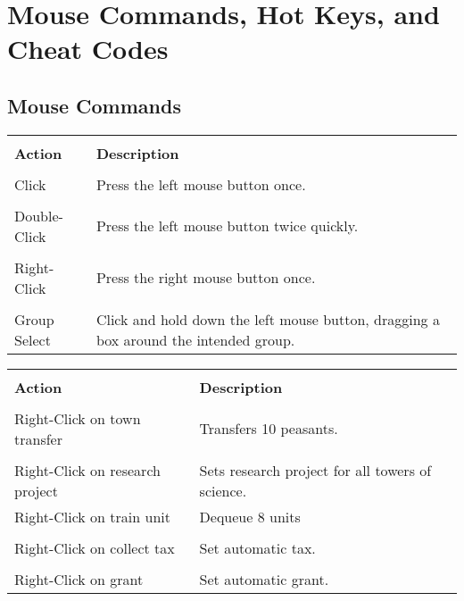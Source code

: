 \section{Mouse Commands, Hot Keys, and Cheat Codes}


\subsection{Mouse Commands}



\begin{tabular}{|p{1in} p{3in}|}
	\hline \\
	\textbf{Action} & \textbf{Description} \\ \\
	\hline
	Click & Press the left mouse button once. \\ \\
	Double-Click & Press the left mouse button twice quickly. \\ \\
	Right-Click	& Press the right mouse button once. \\ \\
	Group Select & Click and hold down the left mouse button, dragging a box around the intended group. \\
	\hline
\end{tabular}	
	
\begin{tabular}{|p{2in} p{2in}|}
	\hline \\
	\textbf{Action} & \textbf{Description} \\ \\
	\hline	
	Right-Click on town transfer & Transfers 10 peasants. \\ \\
	Right-Click on research project	& Sets research project for all towers of science. \\
	Right-Click	on train unit	& Dequeue 8 units \\ \\
	Right-Click on collect tax	& Set automatic tax. \\ \\
	Right-Click on grant	&  Set automatic grant. \\
	\hline
\end{tabular}

